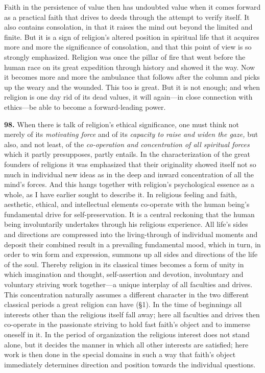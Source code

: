 \documentclass[12pt,a4paper]{book}
\newcommand{\opage}[1]{\marginnote{\footnotesize\textit{[#1]}}}
\begin{document}
Faith in the persistence of value then has undoubted value when it comes forward as a practical faith that
drives to deeds through the attempt to verify itself. It also contains consolation, in that it raises the mind
out beyond the limited and finite. But it is a sign of religion's altered position in spiritual life that it
acquires more and more the significance of consolation, and that this point of view is so strongly emphasized.
Religion was once the pillar of fire that went before the human race on its great expedition through history
and showed it the way. Now it becomes more and more the 
\opage{223}ambulance that follows after the column and picks up
the weary and the wounded. This too is great. But it is not enough; and when religion is one day rid of its
dead values, it will again---in close connection with ethics---be able to become a forward-leading power.

\medskip

\noindent\textbf{98.} When there is talk of religion's ethical significance, one must think not merely of its
\emph{motivating force} and of its \emph{capacity to raise and widen the gaze,} but also, and not least, of the
\emph{co-operation and concentration of all spiritual forces} which it partly presupposes, partly entails. In
the characterization of the great founders of religions it was emphasized that their originality showed itself
not so much in individual new ideas as in the deep and inward concentration of all the mind's forces. And this
hangs together with religion's psychological essence as a whole, as I have earlier sought to describe it. In
religious feeling and faith, aesthetic, ethical, and intellectual elements co-operate with the human being's
fundamental drive for self-preservation. It is a central reckoning that the human being involuntarily undertakes
through his religious experience. All life's sides and directions are compressed into the living-through of
individual moments and deposit their combined result in a prevailing fundamental mood, which in turn, in order
to win form and expression, summons up all sides and directions of the life of the soul. Thereby religion in its
classical times becomes a form of unity in which imagination and thought, self-assertion and devotion,
involuntary and voluntary striving work together---a unique interplay of all faculties and drives. This
concentration naturally assumes a different character in the two different classical periods a great religion can
have (§1). In the time of beginnings all interests other than the religious itself fall away; here all faculties
and drives then co-operate in the passionate striving to hold fast faith's object and to immerse oneself in it.
In the period of organization the religious interest does not stand alone, but it decides the manner in which
all other interests are satisfied; here work is then done in the special domains in such a way that faith's
object immediately determines direction and position towards the individual questions.
\end{document}
